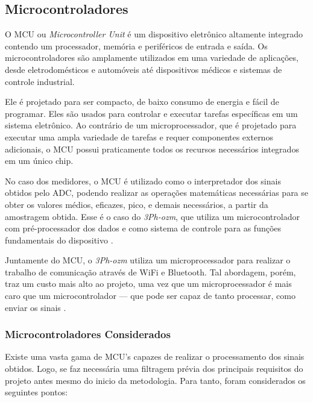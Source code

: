 \subsection{Microcontroladores}\label{subsec:MCU}

O \gls{MCU} ou \textit{Microcontroller Unit} é um dispositivo eletrônico altamente integrado contendo um processador, memória e periféricos de entrada e saída. Os microcontroladores são amplamente utilizados em uma variedade de aplicações, desde eletrodomésticos e automóveis até dispositivos médicos e sistemas de controle industrial.

Ele é projetado para ser compacto, de baixo consumo de energia e fácil de programar. Eles são usados para controlar e executar tarefas específicas em um sistema eletrônico. Ao contrário de um microprocessador, que é projetado para executar uma ampla variedade de tarefas e requer componentes externos adicionais, o \gls{MCU} possui praticamente todos os recursos necessários integrados em um único chip.

No caso dos medidores, o \gls{MCU} é utilizado como o interpretador dos sinais obtidos pelo \gls{ADC}, podendo realizar as operações matemáticas necessárias para se obter os valores médios, eficazes, pico, e demais necessários, a partir da amostragem obtida. Esse é o caso do \textit{3Ph-ozm}, que utiliza um microcontrolador com pré-processador dos dados e como sistema de controle para as funções fundamentais do dispositivo \cite{3ph-ozm}.

Juntamente do \gls{MCU}, o \textit{3Ph-ozm} utiliza um microprocessador para realizar o trabalho de comunicação através de WiFi e Bluetooth.
Tal abordagem, porém, traz um custo mais alto ao projeto, uma vez que um microprocessador é mais caro que um microcontrolador --- que pode ser capaz de tanto processar, como enviar os sinais \cite{uCdiff}.

\subsubsection{Microcontroladores Considerados} \label{subsubsec:uc-disp}

Existe uma vasta gama de \gls{MCU}'s capazes de realizar o processamento dos sinais obtidos. Logo, se faz necessária uma filtragem prévia dos principais requisitos do projeto antes mesmo do inicio da metodologia.
Para tanto, foram considerados os seguintes pontos:

